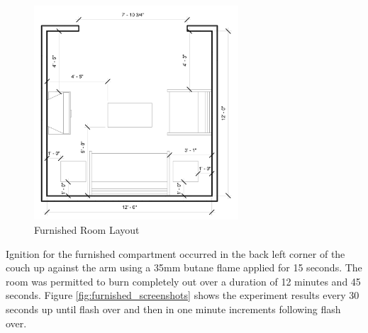 \documentclass{article}
\begin{document}
\begin{figure}[H]
	\centering
	\includegraphics[width=3in]{0_Images/Vent_Limited_Room/Furnished_Room.jpg}
	\caption{Furnished Room Layout}
	\label{fig:furnished_layout}
\end{figure}

Ignition for the furnished compartment occurred in the back left corner of the couch up against the arm using a 35mm butane flame applied for 15 seconds. The room was permitted to burn completely out over a duration of 12 minutes and 45 seconds. Figure \ref{fig:furnished_screenshots}  shows the experiment results every 30 seconds up until flash over and then in one minute increments following flash over. 
\end{document}
